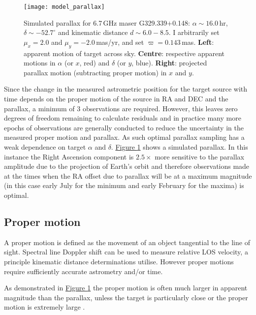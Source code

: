 		\begin{figure}[h]
			\centering
			\texttt{[image: model\_parallax]}
			\caption[Model parallax]{Simulated parallax for 6.7\,GHz maser G329.339$+$0.148: $\alpha\sim16.0$\,hr, $\delta\sim-52.7^\circ$ and kinematic distance $d\sim6.0-8.5$. I arbitrarily set $\mu_x=2.0$ and $\mu_y=-2.0$\,mas/yr, and set $\varpi=0.143$\,mas. {\bf Left}: apparent motion of target across sky. \textbf{Centre}: respective apparent motions in $\alpha$ (or $x$, red) and $\delta$ (or $y$, blue). \textbf{Right}: projected parallax motion (subtracting proper motion) in $x$ and $y$.} \label{fig:model_parallax}
		\end{figure}

		Since the change in the measured astrometric position for the target source with time depends on the proper motion of the source in RA and DEC and the parallax, a minimum of 3 observations are required. However, this leaves zero degrees of freedom remaining to calculate residuals and in practice many more epochs of observations are generally conducted to reduce the uncertainty in the measured proper motion and parallax. As such optimal parallax sampling has a weak dependence on target $\alpha$ and $\delta$. \hyperref[fig:model_parallax]{Figure \ref*{fig:model_parallax}} shows a simulated parallax. In this instance the Right Ascension component is $2.5\times$ more sensitive to the parallax amplitude due to the projection of Earth's orbit and therefore observations made at the times when the RA offset due to parallax will be at a maximum magnitude (in this case early July for the minimum and early February for the maxima) is optimal.
	
	\subsection{Proper motion}
		A proper motion is defined as the movement of an object tangential to the line of sight. Spectral line Doppler shift can be used to measure relative LOS velocity, a principle kinematic distance determinations utilise. However proper motions require sufficiently accurate astrometry and/or time.
		
		As demonstrated in \hyperref[fig:model_parallax]{Figure \ref*{fig:model_parallax}} the proper motion is often much larger in apparent magnitude than the parallax, unless the target is particularly close or the proper motion is extremely large \citep[e.g. Barnards Star; $\mu_y = 10.3\times10^{3}$\,mas/yr][]{Barnard1916}. 
		
